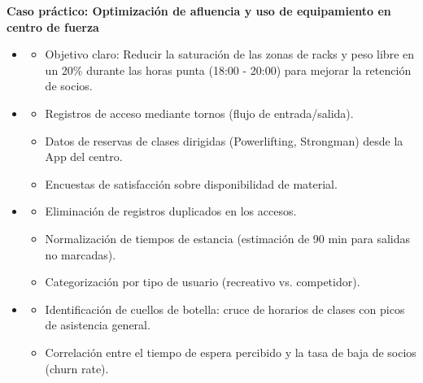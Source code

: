 \begin{solution}
	\textbf{Caso práctico: Optimización de afluencia y uso de equipamiento en centro de fuerza}

	\begin{itemize}
		\item {}
		      \begin{itemize}
			      \item Objetivo claro: Reducir la saturación de las zonas de racks y peso libre en un 20\% durante las horas punta (18:00 - 20:00) para mejorar la retención de socios.
		      \end{itemize}

		\item {}
		      \begin{itemize}
			      \item Registros de acceso mediante tornos (flujo de entrada/salida).
			      \item Datos de reservas de clases dirigidas (Powerlifting, Strongman) desde la App del centro.
			      \item Encuestas de satisfacción sobre disponibilidad de material.
		      \end{itemize}

		\item {}
		      \begin{itemize}
			      \item Eliminación de registros duplicados en los accesos.
			      \item Normalización de tiempos de estancia (estimación de 90 min para salidas no marcadas).
			      \item Categorización por tipo de usuario (recreativo vs. competidor).
		      \end{itemize}

		\item {}
		      \begin{itemize}
			      \item Identificación de cuellos de botella: cruce de horarios de clases con picos de asistencia general.
			      \item Correlación entre el tiempo de espera percibido y la tasa de baja de socios (churn rate).
		      \end{itemize}
	\end{itemize}
\end{solution}
\newpage
